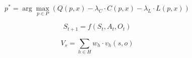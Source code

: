 
\begin{equation}
\label{eq:routing}
p^* = \arg \max_{p \in P} \left( Q(p, x) - \lambda_C \cdot C(p, x) - \lambda_L \cdot L(p, x) \right)
\end{equation}

\begin{equation}
\label{eq:state-transition}
S_{t+1} = f(S_t, A_t, O_t)
\end{equation}

\begin{equation}
\label{eq:strategy-score}
V_s = \sum_{h \in H} w_h \cdot v_h(s, o)
\end{equation}
